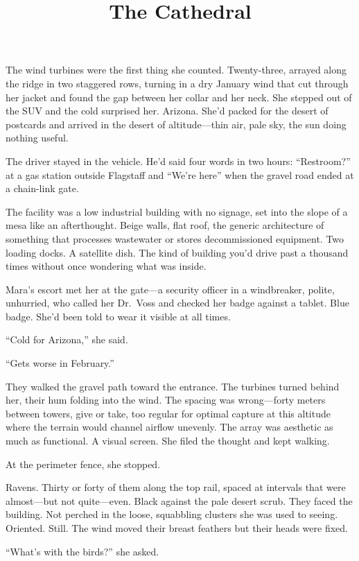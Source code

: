 \documentclass[12pt]{article}
\title{\textbf{The Cathedral}}
\author{}
\date{}
\begin{document}
\maketitle

The wind turbines were the first thing she counted. Twenty-three, arrayed along the ridge in two staggered rows, turning in a dry January wind that cut through her jacket and found the gap between her collar and her neck. She stepped out of the SUV and the cold surprised her. Arizona. She'd packed for the desert of postcards and arrived in the desert of altitude---thin air, pale sky, the sun doing nothing useful.

The driver stayed in the vehicle. He'd said four words in two hours: ``Restroom?'' at a gas station outside Flagstaff and ``We're here'' when the gravel road ended at a chain-link gate.

The facility was a low industrial building with no signage, set into the slope of a mesa like an afterthought. Beige walls, flat roof, the generic architecture of something that processes wastewater or stores decommissioned equipment. Two loading docks. A satellite dish. The kind of building you'd drive past a thousand times without once wondering what was inside.

Mara's escort met her at the gate---a security officer in a windbreaker, polite, unhurried, who called her Dr.\ Voss and checked her badge against a tablet. Blue badge. She'd been told to wear it visible at all times.

``Cold for Arizona,'' she said.

``Gets worse in February.''

They walked the gravel path toward the entrance. The turbines turned behind her, their hum folding into the wind. The spacing was wrong---forty meters between towers, give or take, too regular for optimal capture at this altitude where the terrain would channel airflow unevenly. The array was aesthetic as much as functional. A visual screen. She filed the thought and kept walking.

At the perimeter fence, she stopped.

Ravens. Thirty or forty of them along the top rail, spaced at intervals that were almost---but not quite---even. Black against the pale desert scrub. They faced the building. Not perched in the loose, squabbling clusters she was used to seeing. Oriented. Still. The wind moved their breast feathers but their heads were fixed.

``What's with the birds?'' she asked.
\end{document}
